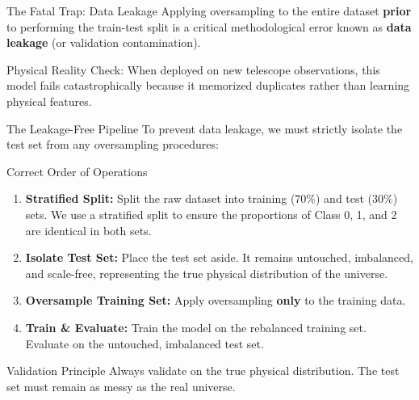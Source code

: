 \documentclass[9pt]{beamer}
\begin{document}
\begin{frame}{The Fatal Trap: Data Leakage}
  Applying oversampling to the entire dataset \textbf{prior} to performing the train-test split is a critical methodological error known as \textbf{data leakage} (or validation contamination).
  \alert{Physical Reality Check:} When deployed on new telescope observations, this model fails catastrophically because it memorized duplicates rather than learning physical features.
\end{frame}

\begin{frame}{The Leakage-Free Pipeline}
  To prevent data leakage, we must strictly isolate the test set from any oversampling procedures:
  \begin{block}{Correct Order of Operations}
    \begin{enumerate}
      \item \textbf{Stratified Split:} Split the raw dataset into training ($70\%$) and test ($30\%$) sets. We use a stratified split to ensure the proportions of Class 0, 1, and 2 are identical in both sets.
      \item \textbf{Isolate Test Set:} Place the test set aside. It remains untouched, imbalanced, and scale-free, representing the true physical distribution of the universe.
      \item \textbf{Oversample Training Set:} Apply oversampling \textbf{only} to the training data.
      \item \textbf{Train \& Evaluate:} Train the model on the rebalanced training set. Evaluate on the untouched, imbalanced test set.
    \end{enumerate}
  \end{block}
  \begin{exampleblock}{Validation Principle}
    Always validate on the true physical distribution. The test set must remain as messy as the real universe.
  \end{exampleblock}
\end{frame}
\end{document}
